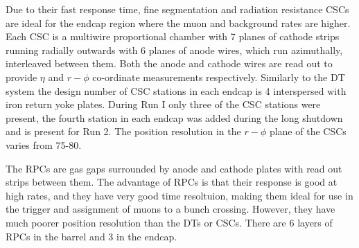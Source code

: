 Due to their fast response time, fine segmentation and radiation resistance \ac{CSC}s are ideal for the endcap region where the muon and background rates are higher. Each \ac{CSC} is a multiwire proportional chamber with 7 planes of cathode strips running radially outwards with 6 planes of anode wires, which run azimuthally, interleaved between them. Both the anode and cathode wires are read out to provide $\eta$ and $r-\phi$ co-ordinate measurements respectively. Similarly to the \ac{DT} system the design number of \ac{CSC} stations in each endcap is 4 interspersed with iron return yoke plates. During Run I only three of the \ac{CSC} stations were present, the fourth station in each endcap was added during the long shutdown and is present for Run 2. The position resolution in the $r-\phi$ plane of the \ac{CSC}s varies from 75-80\micron.

The \ac{RPC}s are gas gaps surrounded by anode and cathode plates with read out strips between them. The advantage of \ac{RPC}s is that their response is good at high rates, and they have very good time resoltuion, making them ideal for use in the trigger and assignment of muons to a bunch crossing. However, they have much poorer position resolution than the \ac{DT}s or \ac{CSC}s. There are 6 layers of \ac{RPC}s in the barrel and 3 in the endcap.

